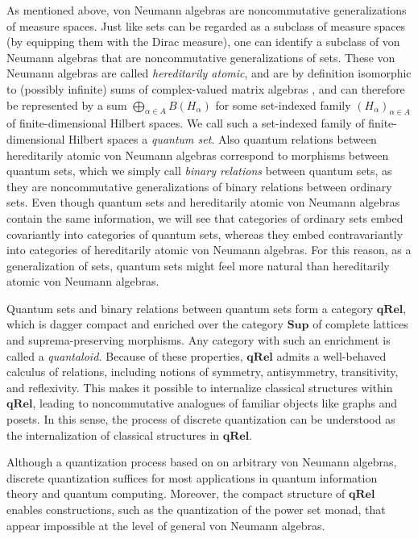 \documentclass[12pt]{tac}
\theoremstyle{definition}
\theoremstyle{remark}
\newcommand{\<}{\langle}
\renewcommand{\>}{\rangle}
\renewcommand{\:}{\colon}
\begin{document}
As mentioned above, von Neumann algebras are noncommutative generalizations of measure spaces. Just like sets can be regarded as a subclass of measure spaces (by equipping them with the Dirac measure), one can identify a subclass of von Neumann algebras that are noncommutative generalizations of sets. These von Neumann algebras are called \emph{hereditarily atomic}, and are by definition isomorphic to (possibly infinite) sums of complex-valued matrix algebras \cite{Kornell18}, and can therefore be represented by a sum $\bigoplus_{\alpha\in A}B(H_\alpha)$ for some set-indexed family $(H_\alpha)_{\alpha\in A}$ of finite-dimensional Hilbert spaces. We call such a set-indexed family of finite-dimensional Hilbert spaces a \emph{quantum set}. Also quantum relations between hereditarily atomic von Neumann algebras correspond to morphisms between quantum sets, which we simply call \emph{binary relations} between quantum sets, as they are noncommutative generalizations of  binary relations between ordinary sets. Even though quantum sets and hereditarily atomic von Neumann algebras contain the same information, we will see that categories of ordinary sets embed covariantly into categories of quantum sets, whereas they embed contravariantly into categories of hereditarily atomic von Neumann algebras. For this reason, as a generalization of sets, quantum sets might feel more natural than hereditarily atomic von Neumann algebras. 

Quantum sets and binary relations between quantum sets form a category $\mathbf{qRel}$, which is dagger compact and enriched over the category $\mathbf{Sup}$ of complete lattices and suprema-preserving morphisms. Any category with such an enrichment is called a \emph{quantaloid.} Because of these properties, $\mathbf{qRel}$ admits a well-behaved calculus of relations, including notions of symmetry, antisymmetry, transitivity, and reflexivity. This makes it possible to internalize classical  structures within $\mathbf{qRel}$, leading to noncommutative analogues of familiar objects like graphs and posets. In this sense, the process of discrete quantization can be understood as the internalization of classical structures in $\mathbf{qRel}.$

Although a quantization process based on on arbitrary von Neumann algebras, discrete quantization  suffices for most applications in quantum information theory and quantum computing. Moreover, the compact structure of $\mathbf{qRel}$ enables constructions, such as the quantization of the power set monad, that appear impossible at the level of general von Neumann algebras.
\end{document}
